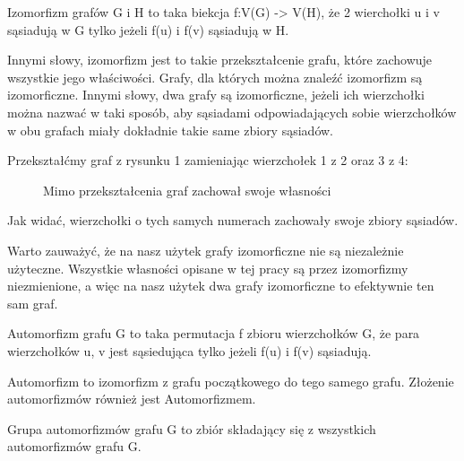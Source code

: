   \begin{definition}
    Izomorfizm grafów G i H to taka biekcja f:V(G) -> V(H), że 2 wierchołki u i v sąsiadują w G tylko jeżeli f(u) i f(v) sąsiadują w H.
  \end{definition}

  Innymi słowy, izomorfizm jest to takie przekształcenie grafu, które zachowuje wszystkie jego właściwości. Grafy, dla których można znaleźć izomorfizm są izomorficzne. Innymi słowy, dwa grafy są izomorficzne, jeżeli ich wierzchołki można nazwać w taki sposób, 
  aby sąsiadami odpowiadających sobie wierzchołków w obu grafach miały dokładnie takie same zbiory sąsiadów.
  

  Przekształćmy graf z rysunku 1 zamieniając wierzchołek 1 z 2 oraz 3 z 4:
  \begin{figure}[H]
    \centering
    \caption{Mimo przekształcenia graf zachował swoje własności}
  \end{figure}

  Jak widać, wierzchołki o tych samych numerach zachowały swoje zbiory sąsiadów. 

  Warto zauważyć, że na nasz użytek grafy izomorficzne nie są niezależnie użyteczne. Wszystkie własności opisane w tej pracy są przez izomorfizmy niezmienione, a więc na nasz użytek dwa grafy izomorficzne to efektywnie ten sam graf.


  \begin{definition}
    Automorfizm grafu G to taka permutacja f zbioru wierzchołków G, że para wierzchołków u, v jest sąsiedująca tylko jeżeli f(u) i f(v) sąsiadują. 
  \end{definition}
  Automorfizm to izomorfizm z grafu początkowego do tego samego grafu. 
  Złożenie automorfizmów również jest Automorfizmem.  

  \begin{definition}
    Grupa automorfizmów grafu G to zbiór składający się z wszystkich automorfizmów grafu G.
  \end{definition}

